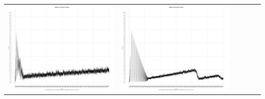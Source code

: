 \begin{table}[htbp]
{\begin{tabular}{l | ccccc}
\begin{minipage}{.15\textwidth}
     			 	\includegraphics[width=\linewidth]{images/mema-triple/I8}
    				 \end{minipage}
    			   &	 \begin{minipage}{.15\textwidth}\vspace{2pt}     							
     			 	\includegraphics[width=\linewidth]{images/mema-triple/I11}
    				 \end{minipage}
    			   &	 \begin{minipage}{.15\textwidth}\vspace{2pt}     							

\end{minipage}
\end{tabular}}
\end{table}
